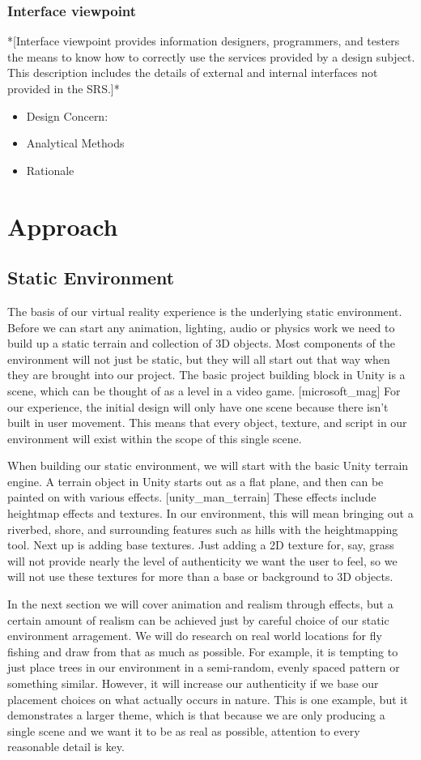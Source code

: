\documentclass[10pt,journal,compsoc,onecolumn, draftclsnofoot]{IEEEtran}
\begin{document}
\subsubsection{Interface viewpoint}
*[Interface viewpoint provides information designers, programmers, and testers the means to know how to correctly use the services provided by a design subject. This description includes the details of external and internal interfaces not provided in the SRS.]*
\begin{itemize}
  \item Design Concern:
  \item Analytical Methods
  \item Rationale
\end{itemize}


\section{Approach}
\subsection{Static Environment}
The basis of our virtual reality experience is the underlying static
environment. Before we can start any animation, lighting, audio or physics
work we need to build up a static terrain and collection of 3D objects.
Most components of the environment will not just be static, but they will all
start out that way when they are brought into our project. The basic project
building block in Unity is a scene, which can be thought of as a level in a
video game. [microsoft\_mag] For our experience, the initial design will
only have one scene because there isn't built in user movement. This means that
every object, texture, and script in our environment will exist within the
scope of this single scene.

When building our static environment, we will start with the basic Unity
terrain engine. A terrain object in Unity starts out as a flat plane, and then
can be painted on with various effects. [unity\_man\_terrain] These effects
include heightmap effects and textures. In our environment, this will mean
bringing out a riverbed, shore, and surrounding features such as hills with the
heightmapping tool. Next up is adding base textures. Just adding a 2D texture
for, say, grass will not provide nearly the level of authenticity we want the
user to feel, so we will not use these textures for more than a base or
background to 3D objects. 

In the next section we will cover animation and realism through effects, but
a certain amount of realism can be achieved just by careful choice of our
static environment arragement. We will do research on real world locations for
fly fishing and draw from that as much as possible. For example, it is tempting
to just place trees in our environment in a semi-random, evenly spaced pattern
or something similar. However, it will increase our authenticity if we base our
placement choices on what actually occurs in nature. This is one example, but
it demonstrates a larger theme, which is that because we are only producing a
single scene and we want it to be as real as possible, attention to every
reasonable detail is key.
\end{document}
